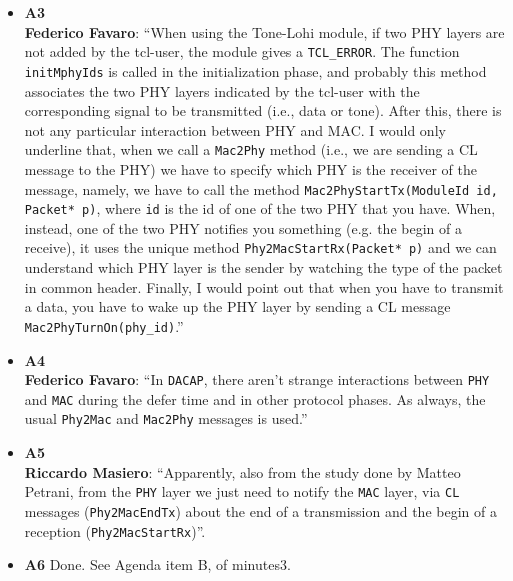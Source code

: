 \documentclass[11pt,journal,draftclsnofoot,onecolumn,twoside,letterpaper]{IEEEtran}
\theoremstyle{definition} \newtheorem{definition}[]{Definition}
\theoremstyle{theorem} \newtheorem{theorem}[]{Theorem}
\begin{document}
\begin{itemize}
 \item {\bf A3} \\
 {\bf Federico Favaro}: ``When using the Tone-Lohi module, if two PHY layers are not added by the tcl-user, the module gives a {\tt TCL\_ERROR}. The function {\tt initMphyIds} is called in the initialization phase, and probably this method associates the two PHY layers indicated by the tcl-user with the corresponding signal to be transmitted (i.e., data or tone). After this, there is not any particular interaction between PHY and MAC. I would only underline that, when we call a {\tt Mac2Phy} method (i.e., we are sending a CL message to the PHY) we have to specify which PHY is the receiver of the message, namely, we have to call the method {\tt Mac2PhyStartTx(ModuleId id, Packet* p)}, where {\tt id} is the id of one of the two PHY that you have. When, instead, one of the two PHY notifies you something (e.g. the begin of a receive), it uses the unique method {\tt Phy2MacStartRx(Packet* p)} and we can understand which PHY layer is the sender by watching the type of the packet in common header. Finally, I would point out that when you have to transmit a data, you have to wake up the PHY layer by sending a CL message {\tt Mac2PhyTurnOn(phy\_id)}.'' 
 \item {\bf A4}\\
 {\bf Federico Favaro}: ``In {\tt DACAP}, there aren't strange interactions between {\tt PHY} and {\tt MAC} during the defer time and in other protocol phases. As always, the usual {\tt Phy2Mac} and {\tt Mac2Phy} messages is used.''
 \item {\bf A5}\\
 {\bf Riccardo Masiero}: ``Apparently, also from the study done by Matteo Petrani, from the {\tt PHY} layer we just need to notify the {\tt MAC} layer, via {\tt CL} messages ({\tt Phy2MacEndTx}) about the end of a transmission and the begin of a reception ({\tt Phy2MacStartRx})''.
 \item {\bf A6} Done. See Agenda item B, of minutes3.
\end{itemize}
\end{document}
